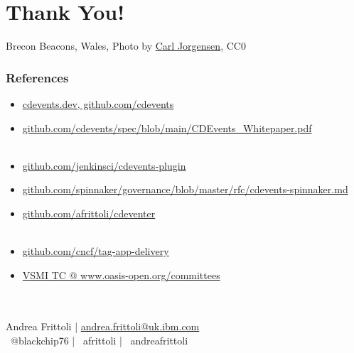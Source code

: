 \documentclass[aspectratio=169,11pt,hyperref={colorlinks=true}]{beamer}
\begin{document}
\section[Thank You]{Thank You!}

\begin{sectionwithpiclargecentral}{Brecon Beacons, Wales, Photo by \href{https://unsplash.com/@scamartist}{\underline{Carl Jorgensen}}, CC0}
\end{sectionwithpiclargecentral}

\begin{blackframe}
  \frametitle{References}
  \begin{itemize}
    \item \href{https://cdevents.dev}{cdevents.dev, github.com/cdevents}
    \item \href{https://github.com/cdevents/spec/blob/main/CDEvents_Whitepaper.pdf}{github.com/cdevents/spec/blob/main/CDEvents\_Whitepaper.pdf} \\~
    \item \href{https://github.com/jenkinsci/cdevents-plugin}{github.com/jenkinsci/cdevents-plugin}
    \item \href{https://github.com/spinnaker/governance/blob/master/rfc/cdevents-spinnaker.md}{github.com/spinnaker/governance/blob/master/rfc/cdevents-spinnaker.md}
    \item \href{https://github.com/afrittoli/cdeventer}{github.com/afrittoli/cdeventer} \\~
    \item \href{https://github.com/cncf/tag-app-delivery}{github.com/cncf/tag-app-delivery}
    \item \href{https://www.oasis-open.org/committees/tc_home.php?wg_abbrev=vsmi}{VSMI TC @ www.oasis-open.org/committees}
  \end{itemize}
  ~\\
  ~\\
  Andrea Frittoli | \href{mailto:andrea.frittoli@uk.ibm.com}{andrea.frittoli@uk.ibm.com} \\
  \faTwitter ~@blackchip76 | \faGithub ~afrittoli | \faLinkedin ~andreafrittoli
\end{blackframe}
\end{document}
